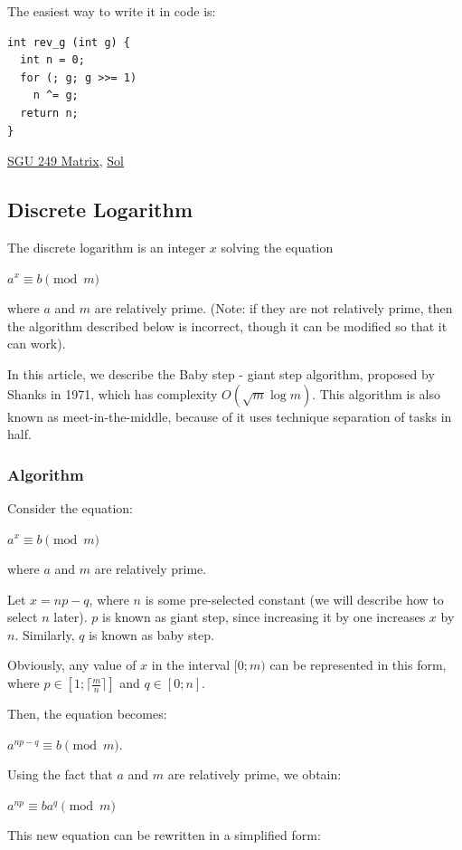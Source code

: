 \documentclass[8pt, a4paper, oneside, twocolumn]{extarticle}
\begin{document}
The easiest way to write it in code is:
\begin{verbatim}
int rev_g (int g) {
  int n = 0;
  for (; g; g >>= 1)
    n ^= g;
  return n;
}
\end{verbatim}

\href{https://codeforces.com/problemsets/acmsguru/problem/99999/249}{SGU 249 Matrix}, \href{https://github.com/sourabhxyz/Competitive-Programming/blob/master/IMP%20QUES/Gray%20Code/SGU249-Matrix.cpp}{Sol}
\subsection{Discrete Logarithm}

The discrete logarithm is an integer $x$ solving the equation

$a^x \equiv b \pmod m$

where $a$ and $m$ are relatively prime. (Note: if they are not relatively prime, then the algorithm described below is incorrect, though it can be modified so that it can work).

In this article, we describe the Baby step - giant step algorithm, proposed by Shanks in 1971, which has complexity $O(\sqrt{m} \log m)$. This algorithm is also known as meet-in-the-middle, because of it uses technique separation of tasks in half.
\subsubsection{Algorithm}

Consider the equation:

$a^x \equiv b \pmod m$

where $a$ and $m$ are relatively prime.

Let $x = np - q$, where $n$ is some pre-selected constant (we will describe how to select $n$ later). $p$ is known as giant step, since increasing it by one increases $x$ by $n$. Similarly, $q$ is known as baby step.

Obviously, any value of $x$ in the interval $[0; m)$ can be represented in this form, where $p \in [1; \lceil \frac{m}{n} \rceil ]$ and $q \in [0; n]$.

Then, the equation becomes:

$a^{np - q} \equiv b \pmod m$.

Using the fact that $a$ and $m$ are relatively prime, we obtain:

$a^{np} \equiv ba^q \pmod m$

This new equation can be rewritten in a simplified form:
\end{document}
